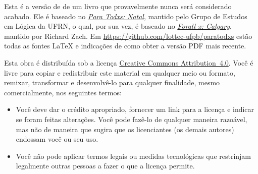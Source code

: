 \parbox{3 in}{
	
Esta é a versão de \mydate{} de um livro que provavelmente nunca será considerado acabado.
Ele é baseado no \href{https://github.com/Grupo-de-Estudos-em-Logica-da-UFRN/Para-Todxs-Natal}{\emph{Para Todxs: Natal}}, mantido pelo Grupo de Estudos em Lógica da UFRN, o qual, por sua vez, é baseado no \href{https://github.com/rzach/forallx-yyc}{\emph{Forall x: Calgary}}, mantido por Richard Zach.
Em \hbox{\url{https://github.com/lottec-ufpb/paratodxs}} estão todas as fontes \LaTeX{} e indicações de como obter a versão PDF mais recente.


Esta obra é distribuída sob a licença \href{https://creativecommons.org/licenses/by/4.0/}{Creative Commons \hbox{Attribution 4.0}}. 
Você é livre para copiar e redistribuir este material em qualquer meio ou formato, remixar, transformar e desenvolvê-lo para qualquer finalidade, mesmo comercialmente, nos seguintes termos:
\begin{itemize}
\item Você deve dar o crédito apropriado, fornecer um link para a licença e indicar se foram feitas alterações. Você pode fazê-lo de qualquer maneira razoável, mas não de maneira que sugira que os licenciantes (os demais autores) endossam você ou seu uso.
\item Você não pode aplicar termos legais ou medidas tecnológicas que restrinjam legalmente outras pessoas a fazer o que a licença permite.
\end{itemize}
	}
\label{cc4by}

